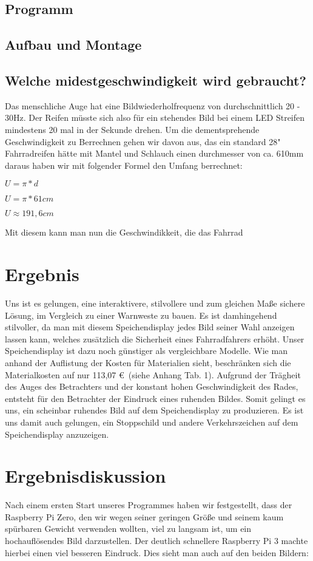 \documentclass [a4paper, 11pt] {article}
\begin{document}
\subsection{Programm}
\subsection{Aufbau und Montage}
\subsection{Welche midestgeschwindigkeit wird gebraucht?}
Das menschliche Auge hat eine Bildwiederholfrequenz von durchschnittlich 20 - 30Hz. Der Reifen müsste sich also für ein stehendes Bild bei einem LED Streifen mindestens 20 mal in der Sekunde drehen. Um die dementsprehende Geschwindigkeit zu Berrechnen gehen wir davon aus, das ein standard 28" Fahrradreifen hätte mit Mantel und Schlauch einen durchmesser von ca. 610mm daraus haben wir mit folgender Formel den Umfang berrechnet:
\begin{center}

$ U = \pi * d $

$ U = \pi * 61cm$ 

$ U \approx 191,6cm$
\end{center}
Mit diesem kann man nun die Geschwindikkeit, die das Fahrrad 



\section{Ergebnis}
Uns ist es gelungen, eine interaktivere, stilvollere und zum gleichen Maße sichere Lösung, im Vergleich zu einer Warnweste zu bauen. Es ist damhingehend stilvoller, da man mit diesem Speichendisplay jedes Bild seiner Wahl anzeigen lassen kann, welches zusätzlich die Sicherheit eines Fahrradfahrers erhöht.
Unser Speichendisplay ist dazu noch günstiger als vergleichbare Modelle. Wie man anhand der Auflistung der Kosten für Materialien sieht, beschränken sich die Materialkosten auf nur 113,07 \euro\ (siehe Anhang Tab. 1). Aufgrund der Trägheit des Auges des Betrachters und der konstant hohen Geschwindigkeit des Rades, entsteht für den Betrachter der Eindruck eines ruhenden Bildes. Somit gelingt es uns, ein scheinbar ruhendes Bild auf dem Speichendisplay zu produzieren. Es ist uns damit auch gelungen, ein Stoppschild und andere Verkehrszeichen auf dem Speichendisplay anzuzeigen.
\section{Ergebnisdiskussion}
Nach einem ersten Start unseres Programmes haben wir festgestellt, dass der Raspberry Pi Zero, den wir wegen seiner geringen Größe und seinem kaum spürbaren Gewicht verwenden wollten, viel zu langsam ist, um ein hochauflösendes Bild darzustellen. Der deutlich schnellere Raspberry Pi 3 machte hierbei einen viel besseren Eindruck. Dies sieht man auch auf den beiden Bildern:
\end{document}
